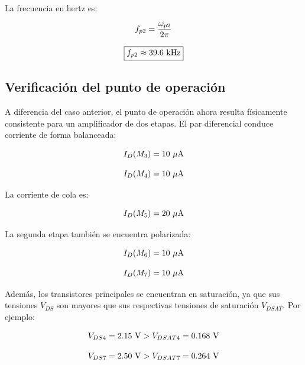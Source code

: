 La frecuencia en hertz es:

\begin{equation}\notag
f_{p2}=
\frac{\omega_{p2}}{2\pi}
\end{equation}

\begin{equation}\notag
\boxed{
f_{p2}\approx 39.6\ \mathrm{kHz}
}
\end{equation}

\subsection*{Verificación del punto de operación}

A diferencia del caso anterior, el punto de operación ahora resulta físicamente consistente para un amplificador de dos etapas. El par diferencial conduce corriente de forma balanceada:

\begin{equation}\notag
I_D(M_3)=10\ \mu\mathrm{A}
\end{equation}

\begin{equation}\notag
I_D(M_4)=10\ \mu\mathrm{A}
\end{equation}

La corriente de cola es:

\begin{equation}\notag
I_D(M_5)=20\ \mu\mathrm{A}
\end{equation}

La segunda etapa también se encuentra polarizada:

\begin{equation}\notag
I_D(M_6)=10\ \mu\mathrm{A}
\end{equation}

\begin{equation}\notag
I_D(M_7)=10\ \mu\mathrm{A}
\end{equation}

Además, los transistores principales se encuentran en saturación, ya que sus tensiones \(V_{DS}\) son mayores que sus respectivas tensiones de saturación \(V_{DSAT}\). Por ejemplo:

\begin{equation}\notag
V_{DS4}=2.15\ \mathrm{V}
>
V_{DSAT4}=0.168\ \mathrm{V}
\end{equation}

\begin{equation}\notag
V_{DS7}=2.50\ \mathrm{V}
>
V_{DSAT7}=0.264\ \mathrm{V}
\end{equation}

